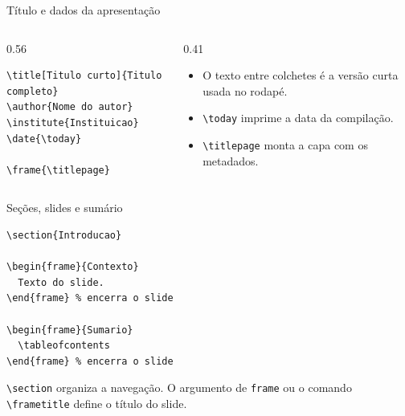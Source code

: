 \begin{frame}[fragile]{Título e dados da apresentação}
\begin{columns}[T]
\begin{column}{0.56\textwidth}
\begin{lstlisting}
\title[Titulo curto]{Titulo completo}
\author{Nome do autor}
\institute{Instituicao}
\date{\today}

\frame{\titlepage}
\end{lstlisting}
\end{column}
\begin{column}{0.41\textwidth}
\begin{itemize}
    \item O texto entre colchetes é a versão curta usada no rodapé.
    \item \verb|\today| imprime a data da compilação.
    \item \verb|\titlepage| monta a capa com os metadados.
\end{itemize}
\end{column}
\end{columns}
\end{frame}

\begin{frame}[fragile]{Seções, slides e sumário}
\begin{lstlisting}
\section{Introducao}

\begin{frame}{Contexto}
  Texto do slide.
\end{frame} % encerra o slide

\begin{frame}{Sumario}
  \tableofcontents
\end{frame} % encerra o slide
\end{lstlisting}

\verb|\section| organiza a navegação. O argumento de \verb|frame| ou o comando \verb|\frametitle| define o título do slide.
\end{frame}
